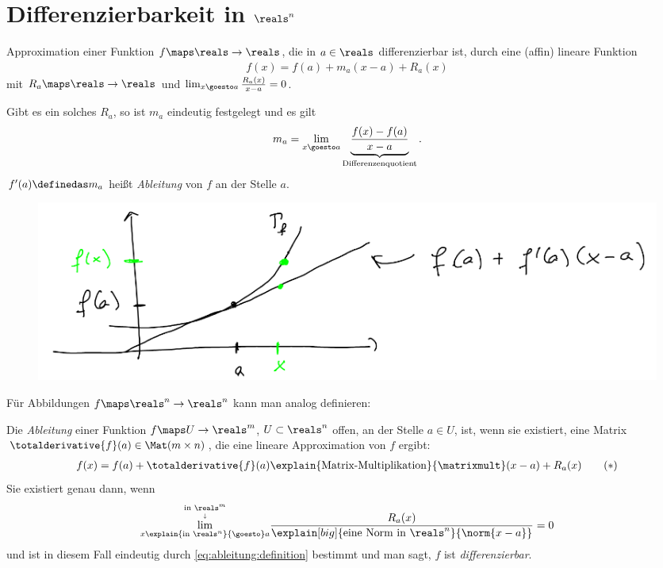\chapter{Differenzierbarkeit in \texorpdfstring{\( \reals^n \)}{R\^n}}
\begin{erinnerung*}
    Approximation einer Funktion \( f\maps \reals\to \reals \), die in \( a\in \reals \) differenzierbar ist, durch eine (affin) lineare Funktion
    \begin{align*}
        f(x)=f(a)+m_a(x-a)+R_a(x)
    \end{align*}
    mit \( R_a\maps \reals\to \reals \) und \( \lim_{x \goesto a}\frac{R_a(x)}{x-a}=0 \).

    Gibt es ein solches \( R_a \), so ist \( m_a \) eindeutig festgelegt und es gilt
    \begin{align*}
        m_a=\lim_{x \goesto a}\underbrace{\frac{f(x)-f(a)}{x-a}}_{\text{Differenzenquotient}}.
    \end{align*}
    \( f'(a)\definedas m_a \) heißt \emph{Ableitung} von \( f \) an der Stelle \( a \).
    \begin{figure}[H]
        \centering
        \includegraphics[width=0.7\linewidth]{figures/ableitung_erinnerung}
        \label{fig:ableitung_erinnerung}
    \end{figure}
    Für Abbildungen \( f\maps \reals^n\to \reals^n \) kann man analog definieren:
\end{erinnerung*}
\begin{definition}
    Die \emph{Ableitung} einer Funktion \( f\maps U\to \reals^m \), \( U\subset \reals^n \) offen, an der Stelle \( a\in U \), ist, wenn sie existiert, eine Matrix \( \totalderivative{f}(a)\in \Mat(m\times n) \), die eine lineare Approximation von \( f \) ergibt:
    \begin{align*}
        f(x)=f(a)+\totalderivative{f}(a)\explain{\text{Matrix-Multiplikation}}{\matrixmult}(x-a)+R_a(x)\tag{\(*\)}\label{eq:ableitung:definition}
    \end{align*}
    Sie existiert genau dann, wenn
    \begin{align*}
        \overset{\underset{\downarrow}{\text{in }\reals^m}}{\lim_{x\explain{\text{in }\reals^n}{\goesto} a}}\frac{R_a(x)}{\explain[big]{\text{eine Norm in \( \reals^n \)}}{\norm{x-a}}}=0
    \end{align*}
    und ist in diesem Fall eindeutig durch \eqref{eq:ableitung:definition} bestimmt und man sagt, \( f \) ist \emph{differenzierbar}.
\end{definition}
